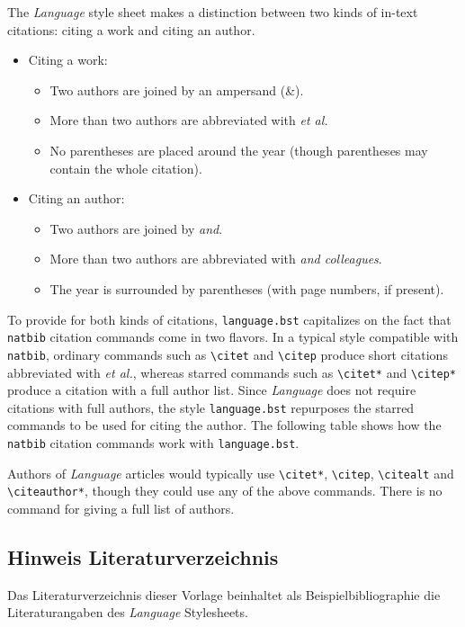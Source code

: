 \documentclass[11pt,a4paper,twoside,openright]{scrbook}
\begin{document}
\noindent
The \emph{Language} style sheet makes a distinction between two kinds of in-text citations: citing a work and citing an author.
\begin{itemize}
\item Citing a work:
  \begin{itemize}
    \setlength{\itemsep}{0pt}
    \setlength{\parsep}{0pt}
  \item Two authors are joined by an ampersand (\&).
  \item More than two authors are abbreviated with \emph{et al.}
  \item No parentheses are placed around the year (though parentheses
    may contain the whole citation). 
  \end{itemize}
\item Citing an author:
  \begin{itemize}
    \setlength{\itemsep}{0pt}
    \setlength{\parsep}{0pt}
  \item Two authors are joined by \emph{and}.
  \item More than two authors are abbreviated with \emph{and colleagues}.
  \item The year is surrounded by parentheses (with page numbers, if
    present).
  \end{itemize} 
\end{itemize}
To provide for both kinds of citations, \verb+language.bst+ capitalizes on the fact that \verb+natbib+ citation commands come in
two flavors. In a typical style compatible with \verb+natbib+, ordinary commands such as \verb+\citet+ and \verb+\citep+ produce short
citations abbreviated with \emph{et al.}, whereas starred commands such as \verb+\citet*+ and \verb+\citep*+ produce a citation with a
full author list. Since \emph{Language} does not require citations with full authors, the style \verb+language.bst+ repurposes the starred commands to be used for citing the author. The following table shows how the \verb+natbib+ citation commands work with \verb+language.bst+.

Authors of \emph{Language} articles would typically use \verb+\citet*+, \verb+\citep+, \verb+\citealt+ and \verb+\citeauthor*+, though they
could use any of the above commands. There is no command for giving a full list of authors.

\subsection{Hinweis Literaturverzeichnis}
Das Literaturverzeichnis dieser Vorlage beinhaltet als Beispielbibliographie die Literaturangaben des \emph{Language} Stylesheets. 
\end{document}
